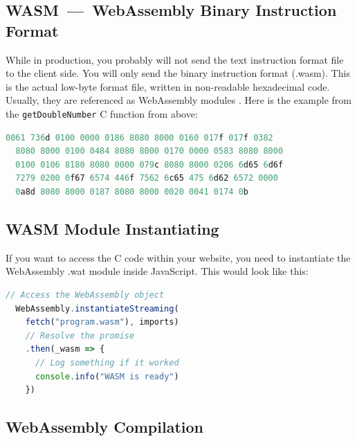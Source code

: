 \documentclass[10pt]{article}
\begin{document}
\begin{sloppypar}
  \subsection{WASM~—~WebAssembly Binary Instruction Format}
  \label{sec:webassembly-binary-instruction-format}

  While in production, you probably will not send the text instruction format file to the client side. You will only send the binary instruction format (.wasm). This is the actual low-byte format file, written in non-readable hexadecimal code. Usually, they are referenced as WebAssembly modules \citep{mozilla_webassembly_2023}. Here is the example from the \lstinline{getDoubleNumber} C function from above:

  \vspace{7pt}
  \begin{lstlisting}[language=C, caption=Code example from above compiled into the WebAssembly \\ Binary Instruction Format., label=lst:binary-example]
  0061 736d 0100 0000 0186 8080 8000 0160 017f 017f 0382
  8080 8000 0100 0484 8080 8000 0170 0000 0583 8080 8000
  0100 0106 8180 8080 0000 079c 8080 8000 0206 6d65 6d6f
  7279 0200 0f67 6574 446f 7562 6c65 475 6d62 6572 0000
  0a8d 8080 8000 0187 8080 8000 0020 0041 0174 0b\end{lstlisting}

  \subsection{WASM Module Instantiating}
  \label{sec:webassembly-module-instantiating}

  If you want to access the C code within your website, you need to instantiate the WebAssembly .wat module inside JavaScript. This would look like this:

  \vspace{7pt}
  \begin{lstlisting}[language=JavaScript, caption=Instantiate the .wasm module in JavaScript., label=lst:javascript-example]
  // Access the WebAssembly object
  WebAssembly.instantiateStreaming(
    fetch("program.wasm"), imports)
    // Resolve the promise
    .then(_wasm => {
      // Log something if it worked
      console.info("WASM is ready")
    })\end{lstlisting}

  \subsection{WebAssembly Compilation}
  \label{sec:webassembly-compilation}


\end{sloppypar}
\end{document}
